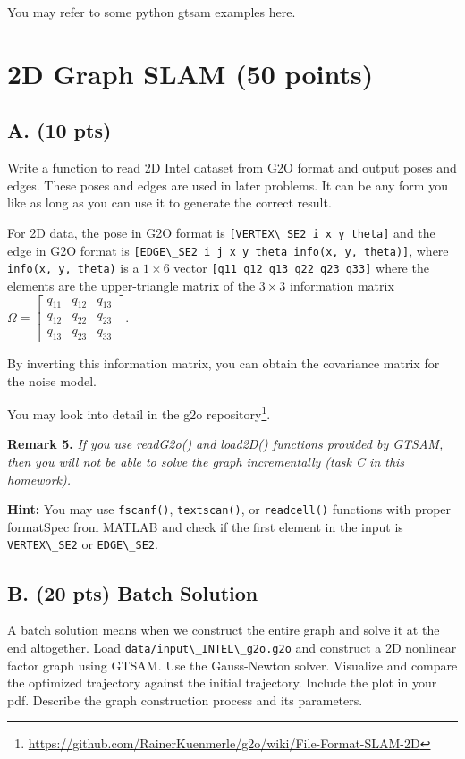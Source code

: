\documentclass[tp]{lcc}
\begin{document}
You may refer to some python gtsam examples here.

\section{2D Graph SLAM (50 points)}
\subsection{A. (10 pts)}
Write a function to read 2D Intel dataset from G2O format and output poses and edges. These poses and edges are used in later problems. It can be any form you like as long as you can use it to generate the correct result.

For 2D data, the pose in G2O format is \lstinline[style=bash]{[VERTEX\_SE2 i x y theta]} and the edge in G2O format is \lstinline[style=bash]{[EDGE\_SE2 i j x y theta info(x, y, theta)]}, where \lstinline[style=bash]{info(x, y, theta)} is a $1 \times 6$ vector \lstinline[style=bash]{[q11 q12 q13 q22 q23 q33]} where the elements are the upper-triangle matrix of the $3 \times 3$ information matrix $\Omega = \begin{bmatrix} q_{11} & q_{12} & q_{13} \\ q_{12} & q_{22} & q_{23} \\ q_{13} & q_{23} & q_{33} \end{bmatrix}$.

By inverting this information matrix, you can obtain the covariance matrix for the noise model.

You may look into detail in the g2o repository\footnote{\url{https://github.com/RainerKuenmerle/g2o/wiki/File-Format-SLAM-2D}}.

\textbf{Remark 5.} \textit{If you use readG2o() and load2D() functions provided by GTSAM, then you will not be able to solve the graph incrementally (task C in this homework).}

\textbf{Hint:} You may use \lstinline[style=bash]{fscanf()}, \lstinline[style=bash]{textscan()}, or \lstinline[style=bash]{readcell()} functions with proper formatSpec from MATLAB and check if the first element in the input is \lstinline[style=bash]{VERTEX\_SE2} or \lstinline[style=bash]{EDGE\_SE2}.

\subsection{B. (20 pts) Batch Solution}
A batch solution means when we construct the entire graph and solve it at the end altogether. Load \lstinline[style=bash]{data/input\_INTEL\_g2o.g2o} and construct a 2D nonlinear factor graph using GTSAM. Use the Gauss-Newton solver. Visualize and compare the optimized trajectory against the initial trajectory. Include the plot in your pdf. Describe the graph construction process and its parameters.
\end{document}

